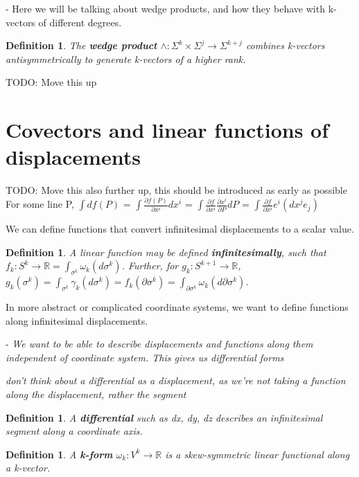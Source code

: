 \documentclass{book}
\newtheorem{defn}[equation]{Definition}
\begin{document}
- Here we will be talking about wedge products, and how they behave with k-vectors of different degrees. 

\begin{defn}
	
	The \textbf{wedge product} $\wedge : \Sigma^k\times \Sigma^j \to \Sigma^{k+j}$ combines k-vectors antisymmetrically to generate k-vectors of a higher rank. 
\end{defn}


TODO: Move this up 
\section{Covectors and linear functions of displacements}

TODO: Move this also further up, this should be introduced as early as possible
For some line P, $\int df(P)$ = $\int \frac{\partial f(P)}{{\partial x^i}} dx^i$ = $\int \frac{\partial f}{\partial x^i}\frac{\partial x^i}{\partial P}dP$ = $\int \frac{{\partial f}}{{\partial x^i}} e^i (dx^j e_j)$

We can define functions that convert infinitesimal displacements to a scalar value. 


\begin{defn}
	A linear function may be defined \textbf{infinitesimally}, such that $f_k : S^k \to \mathbb{R} = \int_{\sigma^k} \omega_k(d\sigma^k)$. Further, for $g_k : S^{k+1} \to \mathbb{R}$, $g_k(\sigma^k) = \int_{\sigma^k} \gamma_k(d\sigma^k) = f_k(\partial\sigma^k) = \int_{\partial\sigma^k}\omega_k(d\partial\sigma^k)$. 
\end{defn}

In more abstract or complicated coordinate systems, we want to define functions along infinitesimal displacements. 

- \emph{We want to be able to describe displacements and functions along them independent of coordinate system. This gives us differential forms}


\emph{don't think about a differential as a displacement, as we're not taking a function along the displacement, rather the segment}
\begin{defn}
	A \textbf{differential} such as dx, dy, dz describes an infinitesimal segment along a coordinate axis. 
\end{defn}

\begin{defn}
	A \textbf{k-form} $\omega_k : V^k \to \mathbb{R}$ is a skew-symmetric linear functional along a k-vector. 
\end{defn}
\end{document}
